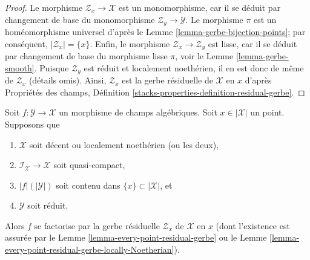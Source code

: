 \begin{proof}
Le morphisme $\mathcal{Z}_x \to \mathcal{X}$ est un monomorphisme, car
il se d\'eduit par changement de base du monomorphisme $\mathcal{Z}_y \to \mathcal{Y}$.
Le morphisme $\pi$ est un hom\'eomorphisme universel d'apr\`es le
Lemme \ref{lemma-gerbe-bijection-points}; par cons\'equent, $|\mathcal{Z}_x| = \{x\}$.
Enfin, le morphisme $\mathcal{Z}_x \to \mathcal{Z}_y$ est lisse,
car il se d\'eduit par changement de base du morphisme lisse $\pi$, voir le
Lemme \ref{lemma-gerbe-smooth}.
Puisque $\mathcal{Z}_y$ est r\'eduit et localement noeth\'erien, il en
est donc de m\^eme de $\mathcal{Z}_x$ (d\'etails omis). Ainsi, $\mathcal{Z}_x$ est
la gerbe r\'esiduelle de $\mathcal{X}$ en $x$ d'apr\`es
Propri\'et\'es des champs, D\'efinition
\ref{stacks-properties-definition-residual-gerbe}.
\end{proof}

\begin{lemma}
\label{lemma-factor-through-residual-space}
Soit $f : \mathcal{Y} \to \mathcal{X}$ un morphisme de champs alg\'ebriques.
Soit $x \in |\mathcal{X}|$ un point. Supposons que
\begin{enumerate}
\item $\mathcal{X}$ soit d\'ecent ou localement noeth\'erien (ou les deux),
\item $\mathcal{I}_\mathcal{X} \to \mathcal{X}$ soit quasi-compact,
\item $|f|(|\mathcal{Y}|)$ soit contenu dans $\{x\} \subset |\mathcal{X}|$, et
\item $\mathcal{Y}$ soit r\'eduit.
\end{enumerate}
Alors $f$ se factorise par la gerbe r\'esiduelle $\mathcal{Z}_x$
de $\mathcal{X}$ en $x$ (dont l'existence est assur\'ee par le
Lemme \ref{lemma-every-point-residual-gerbe} ou le
Lemme \ref{lemma-every-point-residual-gerbe-locally-Noetherian}).
\end{lemma}

